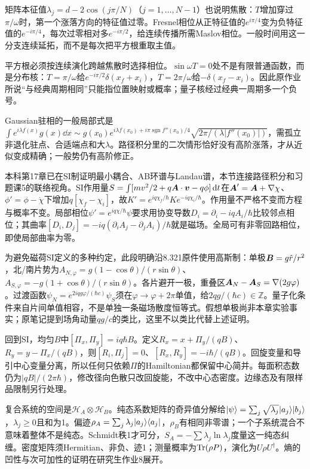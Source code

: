 矩阵本征值$\lambda_j=d-2\cos(j\pi/N)$（$j=1,\ldots,N-1$）也说明焦散：$T$增加穿过$\pi/\omega$时，第一个涨落方向的特征值过零。Fresnel相位从正特征值的$e^{i\pi/4}$变为负特征值的$e^{-i\pi/4}$，每次过零相对多$e^{-i\pi/2}$，给连续传播所需Maslov相位。一般时间用这一分支连续延拓，而不是每次把平方根重取主值。

平方根必须按连续演化跨越焦散时选择相位。$\sin\omega T=0$处不是有限普通函数，而是分布核：$T=\pi/\omega$给$e^{-i\pi/2}\delta(x_f+x_i)$，$T=2\pi/\omega$给$-\delta(x_f-x_i)$。因此原作业所说“与经典周期相同”只能指位置映射或概率；量子核经过经典一周期多一个负号。

Gaussian驻相的一般局部式是$\int e^{i\lambda f(x)}g(x)\dd x\sim g(x_0)e^{i\lambda f(x_0)+i\pi\operatorname{sgn}f''(x_0)/4}\sqrt{2\pi/(\lambda|f''(x_0)|)}$，需孤立非退化驻点、合适端点和大$\lambda$。路径积分里的二次情形恰好没有高阶涨落，才从近似变成精确；一般势仍有高阶修正。

本科第17章已在SI制证明最小耦合、AB环谱与Landau谱，本节连接路径积分和习题课5的联络视角。SI作用量$S=\int[mv^2/2+q\boldsymbol{A}\cdot\boldsymbol{v}-q\phi]\,\mathrm d t$在$\boldsymbol{A}' =\boldsymbol{A}+\nabla\chi$、$\phi'=\phi-\dot\chi$下增加$q[\chi_f-\chi_i]$，故$K'=e^{iq\chi_f/\hbar}Ke^{-iq\chi_i/\hbar}$。作用量不严格不变而方程与概率不变。局部相位$\psi'=e^{iq\chi/\hbar}\psi$要求用协变导数$D_i=\partial_i-iqA_i/\hbar$比较邻点相位；其曲率$[D_i,D_j]=-iq(\partial_iA_j-\partial_jA_i)/\hbar$就是磁场。全局可有非零回路相位，即使局部曲率为零。

为避免磁荷SI定义的多种约定，此段明确沿8.321原件使用高斯制：单极$\boldsymbol{B}=g\hat r/r^2$，北/南片势为$A_{N,\varphi}=g(1-\cos\theta)/(r\sin\theta)$、$A_{S,\varphi}=-g(1+\cos\theta)/(r\sin\theta)$。各片避开一极，重叠区$\boldsymbol{A}_N-\boldsymbol{A}_S=\nabla(2g\varphi)$。过渡函数$\psi_N=e^{2iqg\varphi/(\hbar c)}\psi_S$须在$\varphi\to\varphi+2\pi$单值，给$2qg/(\hbar c)\in\mathbb Z$。量子化条件来自片间单值相容，不是单独一条磁场散度恒等式。假想单极尚非本章实验事实；原笔记提到场角动量$qg/c$的类比，这里不以类比代替上述证明。

回到SI，均匀$B$中$[\Pi_x,\Pi_y]=iq\hbar B$。定义$R_x=x+\Pi_y/(qB)$、$R_y=y-\Pi_x/(qB)$，则$[R_i,\Pi_j]=0$、$[R_x,R_y]=-i\hbar/(qB)$。回旋变量和导引中心变量分离，所以任何只依赖$\Pi$的Hamiltonian都保留中心简并。每面积态数仍为$|qB|/(2\pi\hbar)$，修改径向色散只改回旋能，不改中心态密度。边缘态及有限样品限制另行处理。

复合系统的空间是$\mathcal H_A\otimes\mathcal H_B$。纯态系数矩阵的奇异值分解给$\lvert \psi\rangle=\sum_j\sqrt{\lambda_j}\lvert a_j\rangle\lvert b_j\rangle$，$\lambda_j\ge0$且和为1。偏迹$\rho_A=\sum_j\lambda_j\lvert a_j\rangle\langle a_j\rvert$，$\rho_B$有相同非零谱；一个子系统混合不意味着整体不是纯态。Schmidt秩1才可分，$S_A=-\sum\lambda_j\ln\lambda_j$度量这一纯态纠缠。密度矩阵须Hermitian、非负、迹1；测量概率为$\operatorname{Tr}(\rho P)$，演化为$U\rho U^\dagger$。熵的凹性与次可加性的证明在研究生作业8展开。

